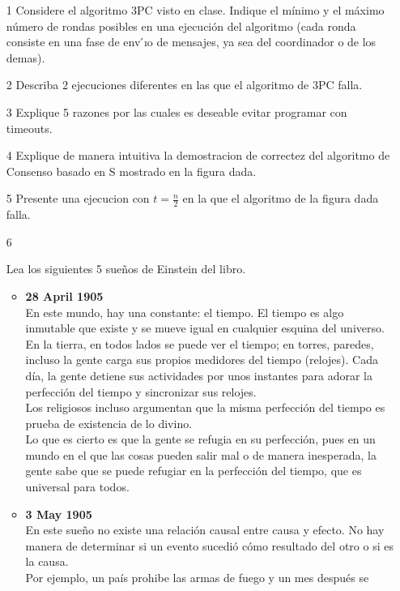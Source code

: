 \documentclass[12pt,a4paper]{report}
\begin{document}
\begin{itemize}
\item[1]{Considere el algoritmo 3PC visto en clase. Indique el mínimo y el
    máximo número de rondas posibles en una ejecución del algoritmo (cada
    ronda consiste en una fase de env ́ıo de mensajes, ya sea del
    coordinador o de los demas).
}
\item[2]{Describa 2 ejecuciones diferentes en las que el algoritmo de 3PC
    falla.
}
\item[3]{Explique 5 razones por las cuales es deseable evitar programar con
    timeouts.
}
\item[4]{Explique de manera intuitiva la demostracion de correctez del
    algoritmo de Consenso basado en S mostrado en la figura dada.
}
\item[5]{Presente una ejecucion con $t=\tfrac{n}{2}$ en la que el algoritmo
    de la figura dada falla.
}
\item[6]{Lea los siguientes 5 sueños de Einstein del libro.
    \begin{itemize}[label=$\bullet$]
        \item{\textbf{28 April 1905}\\
            En este mundo, hay una constante: el tiempo. El tiempo es algo
            inmutable que existe y se mueve igual en cualquier esquina del
            universo. En la tierra, en todos lados se puede ver el tiempo; en
            torres, paredes, incluso la gente carga sus propios medidores del
            tiempo (relojes). Cada día, la gente detiene sus actividades por
            unos instantes para adorar la perfección del tiempo y sincronizar
            sus relojes.\\
            Los religiosos incluso argumentan que la misma perfección del tiempo
            es prueba de existencia de lo divino.\\
            Lo que es cierto es que la gente se refugia en su perfección, pues
            en un mundo en el que las cosas pueden salir mal o de manera
            inesperada, la gente sabe que se puede refugiar en la perfección del
            tiempo, que es universal para todos.
        }
        \item{\textbf{3 May 1905}\\
            En este sueño no existe una relación causal entre causa y efecto. No
            hay manera de determinar si un evento sucedió cómo resultado del
            otro o si es la causa.\\
            Por ejemplo, un país prohibe las armas de fuego y un mes después se
}
\end{itemize}}
\end{itemize}
\end{document}

